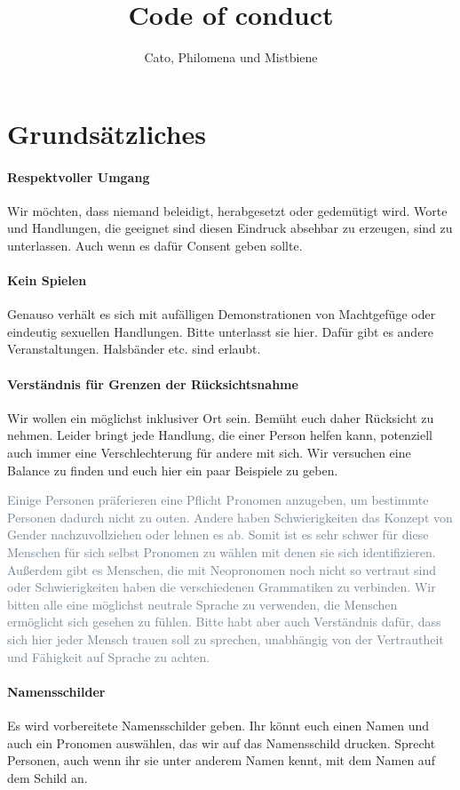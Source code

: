 \documentclass{article}
\title{Code of conduct}
\author{Cato, Philomena und Mistbiene}
\begin{document}
\section{Grundsätzliches}
\paragraph{\textcolor{PastelRed}{Respektvoller Umgang}}
Wir möchten, dass niemand beleidigt, herabgesetzt oder gedemütigt wird. Worte und Handlungen, die geeignet sind diesen Eindruck absehbar zu erzeugen, sind zu unterlassen. Auch wenn es dafür Consent geben sollte. 
\paragraph{\textcolor{PastelRed}{Kein Spielen}}
Genauso verhält es sich mit aufälligen Demonstrationen von Machtgefüge oder eindeutig sexuellen Handlungen. Bitte unterlasst sie hier. Dafür gibt es andere Veranstaltungen. Halsbänder etc. sind erlaubt.
\paragraph{\textcolor{PastelRed}{Verständnis für Grenzen der Rücksichtsnahme}}
Wir wollen ein möglichst inklusiver Ort sein. Bemüht euch daher Rücksicht zu nehmen. Leider bringt jede Handlung, die einer Person helfen kann, potenziell auch immer eine Verschlechterung für andere mit sich. Wir versuchen eine Balance zu finden und euch hier ein paar Beispiele zu geben.

\begingroup{}
\textcolor{SlateGrey}{Einige Personen präferieren eine Pflicht Pronomen anzugeben, um bestimmte Personen dadurch nicht zu outen. Andere haben Schwierigkeiten das Konzept von Gender nachzuvollziehen oder lehnen es ab. Somit ist es sehr schwer für diese Menschen für sich selbst Pronomen zu wählen mit denen sie sich identifizieren. Außerdem gibt es Menschen, die mit Neopronomen noch nicht so vertraut sind oder Schwierigkeiten haben die verschiedenen Grammatiken zu verbinden. 
Wir bitten alle eine möglichst neutrale Sprache zu verwenden, die Menschen ermöglicht sich gesehen zu fühlen. Bitte habt aber auch Verständnis dafür, dass sich hier jeder Mensch trauen soll zu sprechen, unabhängig von der Vertrautheit und Fähigkeit auf Sprache zu achten.}

\endgroup
\paragraph{\textcolor{PastelRed}{Namensschilder}}
Es wird vorbereitete Namensschilder geben. Ihr könnt euch einen Namen und auch ein Pronomen auswählen, das wir auf das Namensschild drucken. Sprecht Personen, auch wenn ihr sie unter anderem Namen kennt, mit dem Namen auf dem Schild an.
\end{document}
